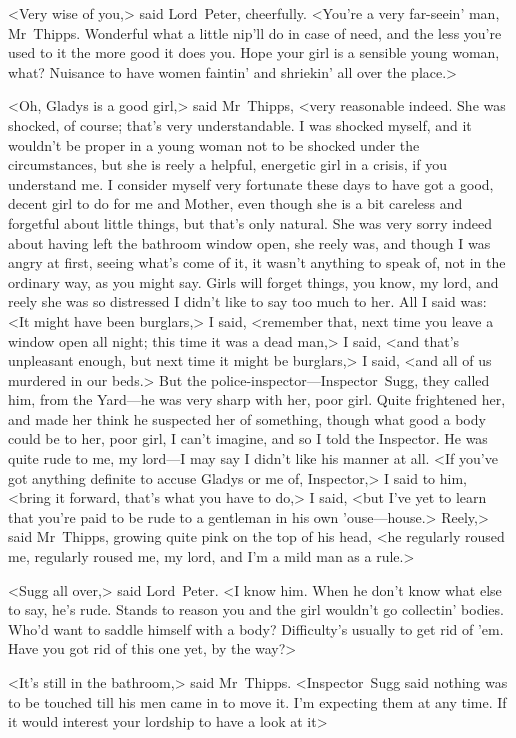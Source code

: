 <Very wise of you,> said Lord~Peter, cheerfully. <You're a very far-seein' man, Mr~Thipps. Wonderful what a little nip'll do in case of need, and the less you're used to it the more good it does you. Hope your girl is a sensible young woman, what? Nuisance to have women faintin' and shriekin' all over the place.>

<Oh, Gladys is a good girl,> said Mr~Thipps, <very reasonable indeed. She was shocked, of course; that's very understandable. I was shocked myself, and it wouldn't be proper in a young woman not to be shocked under the circumstances, but she is reely a helpful, energetic girl in a crisis, if you understand me. I consider myself very fortunate these days to have got a good, decent girl to do for me and Mother, even though she is a bit careless and forgetful about little things, but that's only natural. She was very sorry indeed about having left the bathroom window open, she reely was, and though I was angry at first, seeing what's come of it, it wasn't anything to speak of, not in the ordinary way, as you might say. Girls will forget things, you know, my lord, and reely she was so distressed I didn't like to say too much to her. All I said was: <It might have been burglars,> I said, <remember that, next time you leave a window open all night; this time it was a dead man,> I said, <and that's unpleasant enough, but next time it might be burglars,> I said, <and all of us murdered in our beds.> But the police-inspector—Inspector~Sugg, they called him, from the Yard—he was very sharp with her, poor girl. Quite frightened her, and made her think he suspected her of something, though what good a body could be to her, poor girl, I can't imagine, and so I told the Inspector. He was quite rude to me, my lord—I may say I didn't like his manner at all. <If you've got anything definite to accuse Gladys or me of, Inspector,> I said to him, <bring it forward, that's what you have to do,> I said, <but I've yet to learn that you're paid to be rude to a gentleman in his own 'ouse—house.> Reely,> said Mr~Thipps, growing quite pink on the top of his head, <he regularly roused me, regularly roused me, my lord, and I'm a mild man as a rule.>

<Sugg all over,> said Lord~Peter. <I know him. When he don't know what else to say, he's rude. Stands to reason you and the girl wouldn't go collectin' bodies. Who'd want to saddle himself with a body? Difficulty's usually to get rid of 'em. Have you got rid of this one yet, by the way?>

<It's still in the bathroom,> said Mr~Thipps. <Inspector~Sugg said nothing was to be touched till his men came in to move it. I'm expecting them at any time. If it would interest your lordship to have a look at it\longdash>

